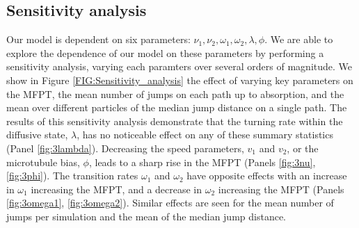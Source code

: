 \documentclass[twocolumn]{biophys}
\begin{document}
\subsection{Sensitivity analysis}
Our model is dependent on six parameters: $\nu_1, \nu_2, \omega_1, \omega_2, \lambda, \phi$. 
We are able to explore the dependence of our model on these parameters by performing a sensitivity analysis, varying each paramters over several orders of magnitude.
We show  in Figure \ref{FIG:Sensitivity_analysis} the effect of varying key parameters on the MFPT, the mean number of jumps on each path up to absorption, and the mean over different particles of the median jump distance on a single path.
The results of this sensitivity analysis demonstrate that the turning rate within the diffusive state, $\lambda$, has no noticeable effect on any of these summary statistics (Panel \ref{fig:3lambda}).
Decreasing the speed parameters, $v_1$ and $v_2$, or the microtubule bias, $\phi$, leads to a sharp rise in the MFPT (Panels \ref{fig:3nu}, \ref{fig:3phi}). 
The transition rates $\omega_1$ and $\omega_2$ have opposite effects with an increase in $\omega_1$ increasing the MFPT, and a decrease in $\omega_2$ increasing the MFPT (Panels \ref{fig:3omega1}, \ref{fig:3omega2}). 
Similar effects are seen for the mean number of jumps per simulation and the mean of the median jump distance.
\end{document}
